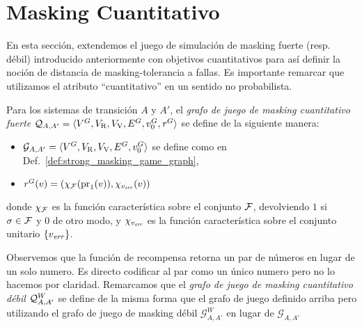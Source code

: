 \section{Masking Cuantitativo} \label{sec:QuantMask}
En esta sección, extendemos el juego de simulación de masking fuerte (resp. débil) introducido anteriormente con objetivos cuantitativos para así definir la noción de distancia de masking-tolerancia a fallas.
Es importante remarcar que utilizamos el atributo  ``cuantitativo'' en un sentido no probabilista.
\begin{definition}  
  Para los sistemas de transición $A$ y $A'$, el \emph{grafo de juego de masking cuantitativo fuerte} 
  $\mathcal{Q}_{A, A'} = \langle V^G, V_{\mathrm{R}}, V_{\mathrm{V}}, E^G,  v_0^G,  \mathit{r}^G \rangle$ se define de la siguiente manera:
 
\begin{itemize}
\item
  $\mathcal{G}_{A, A'}=\langle V^G, V_{\mathrm{R}}, V_{\mathrm{V}}, E^G, v_0^G \rangle$ se define como en Def.~\ref{def:strong_masking_game_graph},
\item
  $ \mathit{r}^G(v) = (\chi_{\mathcal{F}}(\operatorname{pr}_{1}(v)), \chi_{v_{\mathit{err}}}(v))$

\end{itemize}
%
donde $\chi_{\mathcal{F}}$ es la función característica sobre el conjunto $\mathcal{F}$, devolviendo $1$ si $\sigma \in \mathcal{F}$ y $0$ de otro modo, y $\chi_{v_{\mathit{err}}}$ es la función característica sobre el conjunto unitario $\{v_{\mathit{err}}\}$.
\end{definition}
Observemos que la función de recompensa retorna un par de números en lugar de un solo numero. Es directo codificar al par como un único numero pero no lo hacemos por claridad. Remarcamos que el
\emph{grafo de juego de masking cuantitativo débil} $\mathcal{Q}^W_{A,A'}$
se define de la misma forma que el grafo de juego definido arriba pero utilizando el grafo de juego de masking débil $\mathcal{G}^W_{A, A'}$ en lugar de 
$\mathcal{G}_{A, A'}$


